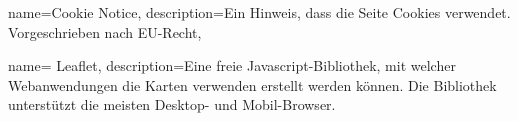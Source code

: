 \makenoidxglossaries

{
	name=Cookie Notice,
	description={Ein Hinweis, dass die Seite Cookies verwendet. Vorgeschrieben nach EU-Recht},
}

{
    name= Leaflet,
    description={Eine freie Javascript-Bibliothek, mit welcher Webanwendungen die Karten verwenden erstellt werden können. Die Bibliothek unterstützt die meisten 
    Desktop- und Mobil-Browser. }
    }